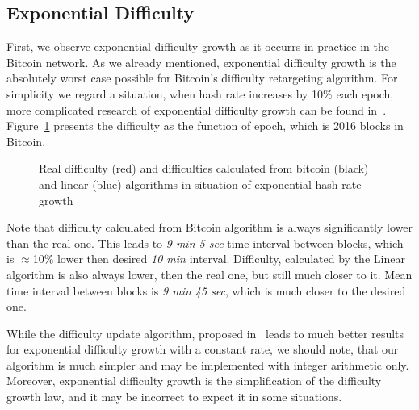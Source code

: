 \documentclass[number,preprint,review]{elsarticle}
\begin{document}
\subsection{Exponential Difficulty}

First, we observe exponential difficulty growth as it occurrs in practice in the Bitcoin network. As we already mentioned, exponential difficulty growth is the absolutely worst case possible for Bitcoin’s difficulty retargeting algorithm.
For simplicity we regard a situation, when hash rate increases by 10\% each epoch, more complicated research of exponential difficulty growth can be found in~\cite{kraft2015difficulty}.
Figure~\ref{fig:exp} presents the difficulty as the function of epoch, which is 2016 blocks in Bitcoin.

\begin{figure}[h]
\caption{Real difficulty (red) and difficulties calculated from bitcoin (black) and linear (blue) algorithms in situation of exponential hash rate growth}
\label{fig:exp}
\end{figure}

Note that difficulty calculated from Bitcoin algorithm is always significantly lower than the real one.
This leads to \textit{9 min 5 sec} time interval between blocks, which is $\approx$10\% lower then desired \textit{10 min} interval.
Difficulty, calculated by the Linear algorithm is also always lower, then the real one, but still much closer to it.
Mean time interval between blocks is \textit{9 min 45 sec}, which is much closer to the desired one.

While the difficulty update algorithm, proposed in~\cite{kraft2015difficulty} leads to much better results for exponential difficulty growth with a constant rate, we should note, that our algorithm is much simpler and may be implemented with integer arithmetic only.
Moreover, exponential difficulty growth is the simplification of the difficulty growth law, and it may be incorrect to expect it in some situations.
\end{document}
